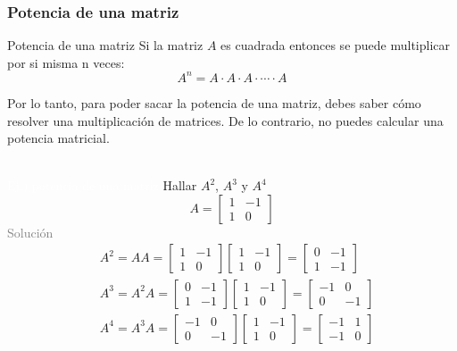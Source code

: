 \subsubsection{Potencia de una matriz}
\begin{Theorem*} {Potencia de una matriz}
	Si la matriz $A$ es cuadrada entonces se puede multiplicar por si misma n veces:
	$$ A^n=A\cdot A\cdot A\cdot \cdots \cdot A $$
\end{Theorem*}
Por lo tanto, para poder sacar la potencia de una matriz, debes saber cómo resolver una multiplicación de matrices. De lo contrario, no puedes calcular una potencia matricial. \\\\
\addtocounter{exr}{1} 
\colorbox{gray!55}{\textcolor{white}{Ej.) potencia de una matriz}}
	Hallar $A^2$, $A^3$ y $A^4$
	$$ A=\begin{bmatrix}
		1 & -1 \\
		1 & 0
	\end{bmatrix} $$
\textcolor{gray}{Solución }
	\begin{align*}
		&A^2=AA=\begin{bmatrix}
			1 & -1 \\
			1 & 0
		\end{bmatrix}\begin{bmatrix}
			1 & -1 \\
			1 & 0
		\end{bmatrix}=\begin{bmatrix}
			0 & -1 \\
			1 & -1
		\end{bmatrix} \\
		&A^3=A^2A=\begin{bmatrix}
			0 & -1 \\
			1 & -1
		\end{bmatrix}\begin{bmatrix}
			1 & -1 \\
			1 & 0
		\end{bmatrix}=\begin{bmatrix}
			-1 & 0 \\
			0 & -1
		\end{bmatrix} \\
		&A^4=A^3A=\begin{bmatrix}
			-1 & 0 \\
			0 & -1
		\end{bmatrix}\begin{bmatrix}
			1 & -1 \\
			1 & 0
		\end{bmatrix}=\begin{bmatrix}
			-1 & 1 \\
			-1 & 0
		\end{bmatrix}
	\end{align*}
